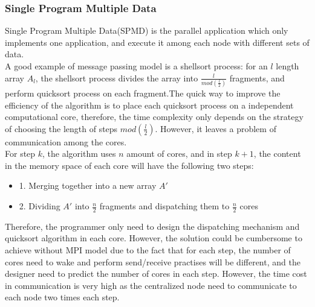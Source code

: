 \documentclass[11pt,openright,a4paper]{report}
\begin{document}
\subsubsection{Single Program Multiple Data}
Single Program Multiple Data(SPMD) is the parallel application which only implements one application, and execute it among each node with different sets of data.\\
A good example of message passing model is a shellsort process: for an $l$ length array $A_{l}$, the shellsort process divides the array into $\frac{l}{mod(\frac{l}{2})}$ fragments, and perform quicksort process on each fragment.The quick way to improve the efficiency of the algorithm is to place each quicksort process on a independent computational core, therefore, the time complexity only depends on the strategy of choosing the length of steps $mod(\frac{l}{2})$. However, it leaves a problem of communication among the cores.\\
For step $k$, the algorithm uses $n$ amount of cores, and in step $k+1$, the content in the memory space of each core will have the following two steps:
\begin{itemize}
	\item{1.} Merging together into a new array ${A}'$
    \item{2.} Dividing ${A}'$ into $\frac{n}{2}$ fragments and dispatching them to $\frac{n}{2}$ cores
\end{itemize}
Therefore, the programmer only need to design the dispatching mechanism and quicksort algorithm in each core. However, the solution could be cumbersome to achieve without MPI model due to the fact that for each step, the number of cores need to wake and perform send/receive practises will be different, and the designer need to predict the number of cores in each step. However, the time cost in communication is very high as the centralized node need to communicate to each node two times each step.\\
\end{document}
